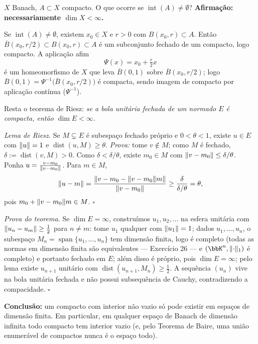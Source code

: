 \begin{exercicio}{$X$ Banach, $A\subset X$ compacto. O que ocorre se $\operatorname{int}(A)\neq\emptyset$?}
\sol
\textbf{Afirmação: necessariamente $\dim X<\infty$.}

Se $\operatorname{int}(A)\neq\emptyset$, existem $x_0\in X$ e $r>0$ com $B(x_0,r)\subset A$. Então $\overline{B}(x_0,r/2)\subset B(x_0,r)\subset A$ é um subconjunto fechado de um compacto, logo compacto. A aplicação afim
\[ \Psi(x)=x_0+\tfrac{r}{2}x \]
é um homeomorfismo de $X$ que leva $\overline{B}(0,1)$ sobre $\overline{B}(x_0,r/2)$; logo $\overline{B}(0,1)=\Psi^{-1}\bigl(\overline{B}(x_0,r/2)\bigr)$ é compacta, sendo imagem de compacto por aplicação contínua ($\Psi^{-1}$).

Resta o teorema de Riesz: \emph{se a bola unitária fechada de um normado $E$ é compacta, então $\dim E<\infty$.}

\emph{Lema de Riesz.} Se $M\subsetneq E$ é subespaço fechado próprio e $0<\theta<1$, existe $u\in E$ com $\lVert u\rVert=1$ e $\operatorname{dist}(u,M)\ge\theta$. \emph{Prova:} tome $v\notin M$; como $M$ é fechado, $\delta:=\operatorname{dist}(v,M)>0$. Como $\delta<\delta/\theta$, existe $m_0\in M$ com $\lVert v-m_0\rVert\le\delta/\theta$. Ponha $u=\frac{v-m_0}{\lVert v-m_0\rVert}$. Para $m\in M$,
\[ \lVert u-m\rVert=\frac{\lVert v-m_0-\lVert v-m_0\rVert m\rVert}{\lVert v-m_0\rVert}\ge\frac{\delta}{\delta/\theta}=\theta, \]
pois $m_0+\lVert v-m_0\rVert m\in M$. \hfill$\square$

\emph{Prova do teorema.} Se $\dim E=\infty$, construímos $u_1,u_2,\dots$ na esfera unitária com $\lVert u_n-u_m\rVert\ge\frac12$ para $n\neq m$: tome $u_1$ qualquer com $\lVert u_1\rVert=1$; dados $u_1,\dots,u_n$, o subespaço $M_n=\operatorname{span}\{u_1,\dots,u_n\}$ tem dimensão finita, logo é completo (todas as normas em dimensão finita são equivalentes --- Exercício 26 --- e $(\bbK^n,\norm{\cdot}_1)$ é completo) e portanto fechado em $E$; além disso é próprio, pois $\dim E=\infty$; pelo lema existe $u_{n+1}$ unitário com $\operatorname{dist}(u_{n+1},M_n)\ge\frac12$. A sequência $(u_n)$ vive na bola unitária fechada e não possui subsequência de Cauchy, contradizendo a compacidade. \hfill$\square$

\textbf{Conclusão:} um compacto com interior não vazio só pode existir em espaços de dimensão finita. Em particular, em qualquer espaço de Banach de dimensão infinita todo compacto tem interior vazio (e, pelo Teorema de Baire, uma união enumerável de compactos nunca é o espaço todo).
\end{exercicio}

